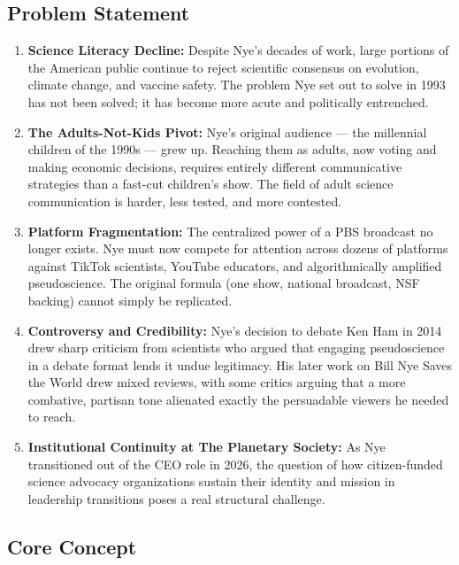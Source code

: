 \documentclass[11pt,letterpaper]{article}
\begin{document}
\subsection{Problem Statement}

\begin{enumerate}[leftmargin=*, label=\textbf{P\arabic*.}]

\item \textbf{Science Literacy Decline:} Despite Nye's decades of work, large portions of the American public continue to reject scientific consensus on evolution, climate change, and vaccine safety. The problem Nye set out to solve in 1993 has not been solved; it has become more acute and politically entrenched.

\item \textbf{The Adults-Not-Kids Pivot:} Nye's original audience --- the millennial children of the 1990s --- grew up. Reaching them as adults, now voting and making economic decisions, requires entirely different communicative strategies than a fast-cut children's show. The field of adult science communication is harder, less tested, and more contested.

\item \textbf{Platform Fragmentation:} The centralized power of a PBS broadcast no longer exists. Nye must now compete for attention across dozens of platforms against TikTok scientists, YouTube educators, and algorithmically amplified pseudoscience. The original formula (one show, national broadcast, NSF backing) cannot simply be replicated.

\item \textbf{Controversy and Credibility:} Nye's decision to debate Ken Ham in 2014 drew sharp criticism from scientists who argued that engaging pseudoscience in a debate format lends it undue legitimacy. His later work on Bill Nye Saves the World drew mixed reviews, with some critics arguing that a more combative, partisan tone alienated exactly the persuadable viewers he needed to reach.

\item \textbf{Institutional Continuity at The Planetary Society:} As Nye transitioned out of the CEO role in 2026, the question of how citizen-funded science advocacy organizations sustain their identity and mission in leadership transitions poses a real structural challenge.

\end{enumerate}

\subsection{Core Concept}
\end{document}
